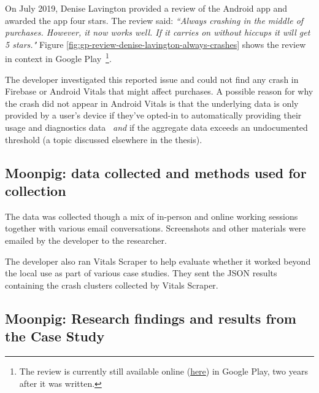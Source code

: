 On  July 2019, Denise Lavington provided a review of the Android app and awarded the app four stars. The review said: \emph{``Always crashing in the middle of purchases. However, it now works well. If it carries on without hiccups it will get 5 stars."} Figure \ref{fig:gp-review-denise-lavington-always-crashes} shows the review in context in Google Play~\footnote{The review is currently still available online (\href{https://play.google.com/store/apps/details?id=com.commonagency.moonpig.uk&reviewId=gp\%3AAOqpTOH68VB5eWqnu7UAqcC81_rbOfWl6dzL_g48jrg0T40MPWBkMxe01KjStXZF6F57nxZxQa-AqosRKDd1xQ}{here}) in Google Play, two years after it was written.}.

The developer investigated this reported issue and could not find any crash in Firebase or Android Vitals that might affect purchases. A possible reason for why the crash did not appear in Android Vitals is that the underlying data is only provided by a user's device if they've opted-in to automatically providing their usage and diagnostics data~\citep{google_play_view_crashes_and_anr_errors} \textit{and} if the aggregate data exceeds an undocumented threshold (a topic discussed elsewhere in the thesis).

\subsection{Moonpig: data collected and methods used for collection}
The data was collected though a mix of in-person and online working sessions together with various email conversations. Screenshots and other materials were emailed by the developer to the researcher. 

The developer also ran Vitals Scraper to help evaluate whether it worked beyond the local use as part of various case studies. They sent the JSON results containing the crash clusters collected by Vitals Scraper.  

\subsection{Moonpig: Research findings and results from the Case Study}

